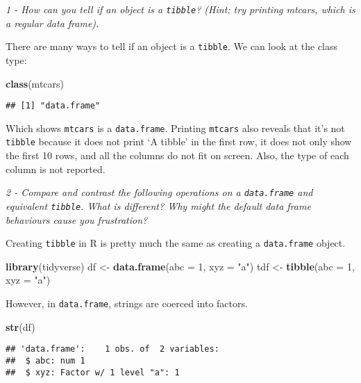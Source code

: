 \documentclass[]{article}
\newenvironment{Shaded}{\begin{snugshade}}{\end{snugshade}}
\newcommand{\KeywordTok}[1]{\textcolor[rgb]{0.13,0.29,0.53}{\textbf{#1}}}
\newcommand{\DataTypeTok}[1]{\textcolor[rgb]{0.13,0.29,0.53}{#1}}
\newcommand{\DecValTok}[1]{\textcolor[rgb]{0.00,0.00,0.81}{#1}}
\newcommand{\StringTok}[1]{\textcolor[rgb]{0.31,0.60,0.02}{#1}}
\newcommand{\NormalTok}[1]{#1}
\theoremstyle{definition}
\theoremstyle{definition}
\theoremstyle{definition}
\theoremstyle{remark}
\begin{document}
\emph{1 - How can you tell if an object is a \texttt{tibble}? (Hint: try
printing mtcars, which is a regular data frame).}

There are many ways to tell if an object is a \texttt{tibble}. We can
look at the class type:

\begin{Shaded}
\begin{Highlighting}[]
\KeywordTok{class}\NormalTok{(mtcars)}
\end{Highlighting}
\end{Shaded}

\begin{verbatim}
## [1] "data.frame"
\end{verbatim}

Which shows \texttt{mtcars} is a \texttt{data.frame}. Printing
\texttt{mtcars} also reveals that it's not \texttt{tibble} because it
does not print `A tibble' in the first row, it does not only show the
first 10 rows, and all the columns do not fit on screen. Also, the type
of each column is not reported.

\emph{2 - Compare and contrast the following operations on a
\texttt{data.frame} and equivalent \texttt{tibble}. What is different?
Why might the default data frame behaviours cause you frustration?}

Creating \texttt{tibble} in R is pretty much the same as creating a
\texttt{data.frame} object.

\begin{Shaded}
\begin{Highlighting}[]
\KeywordTok{library}\NormalTok{(tidyverse)}
\NormalTok{df <-}\StringTok{ }\KeywordTok{data.frame}\NormalTok{(}\DataTypeTok{abc =} \DecValTok{1}\NormalTok{, }\DataTypeTok{xyz =} \StringTok{"a"}\NormalTok{)}
\NormalTok{tdf <-}\StringTok{ }\KeywordTok{tibble}\NormalTok{(}\DataTypeTok{abc =} \DecValTok{1}\NormalTok{, }\DataTypeTok{xyz =} \StringTok{"a"}\NormalTok{)}
\end{Highlighting}
\end{Shaded}

However, in \texttt{data.frame}, strings are coerced into factors.

\begin{Shaded}
\begin{Highlighting}[]
\KeywordTok{str}\NormalTok{(df)}
\end{Highlighting}
\end{Shaded}

\begin{verbatim}
## 'data.frame':    1 obs. of  2 variables:
##  $ abc: num 1
##  $ xyz: Factor w/ 1 level "a": 1
\end{verbatim}
\end{document}
